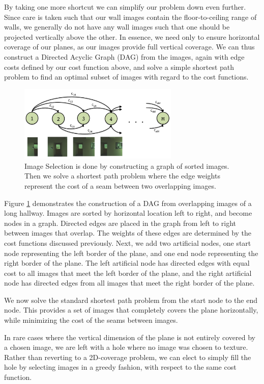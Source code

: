 \documentclass[10pt,twocolumn,letterpaper]{article}
\begin{document}
By taking one more shortcut we can simplify our problem down even
further. Since care is taken such that our wall images contain the
floor-to-ceiling range of walls, we generally do not have any wall
images such that one should be projected vertically above the
other. In essence, we need only to ensure horizontal coverage of our
planes, as our images provide full vertical coverage. We can thus
construct a Directed Acyclic Graph (DAG) from the images, again with
edge costs defined by our cost function above, and solve a simple
shortest path problem to find an optimal subset of images with regard
to the cost functions.

\begin{figure}
  \centering
  \includegraphics[width=3in]{DynProg.pdf}
  \caption{Image Selection is done by constructing a graph of sorted
    images. Then we solve a shortest path problem where the edge
    weights represent the cost of a seam between two overlapping
    images.}
  \label{fig:DynProg}
\end{figure}

Figure \ref{fig:DynProg} demonstrates the construction of a DAG from
overlapping images of a long hallway. Images are sorted by horizontal
location left to right, and become nodes in a graph. Directed edges
are placed in the graph from left to right between images that
overlap. The weights of these edges are determined by the cost
functions discussed previously. Next, we add two artificial nodes, one
start node representing the left border of the plane, and one end node
representing the right border of the plane. The left artificial node
has directed edges with equal cost to all images that meet the left
border of the plane, and the right artificial node has directed edges
from all images that meet the right border of the plane.

We now solve the standard shortest path problem from the start node to
the end node. This provides a set of images that completely covers the
plane horizontally, while minimizing the cost of the seams between
images.

In rare cases where the vertical dimension of the plane is not entirely
covered by a chosen image, we are left with a hole where no image was
chosen to texture. Rather than reverting to a 2D-coverage problem, we
can elect to simply fill the hole by selecting images in a
greedy fashion, with respect to the same cost function.
\end{document}
